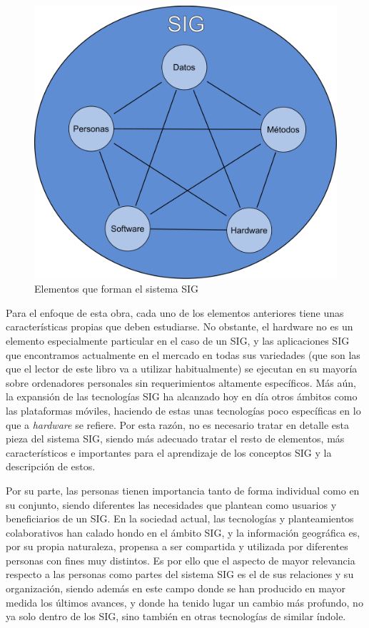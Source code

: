 \begin{figure}[h]   
\centering
\includegraphics[width=.55\mycolumnwidth]{Introduccion_fundamentos/Elementos_SIG.pdf}
\caption{\small Elementos que forman el sistema SIG}
\label{Fig:Elementos_SIG} 
\end{figure}

Para el enfoque de esta obra, cada uno de los elementos anteriores tiene unas características propias que deben estudiarse. No obstante, el hardware no es un elemento especialmente particular en el caso de un SIG, y las aplicaciones SIG que encontramos actualmente en el mercado en todas sus variedades (que son las que el lector de este libro va a utilizar habitualmente) se ejecutan en su mayoría sobre ordenadores personales sin requerimientos altamente específicos. Más aún, la expansión de las tecnologías SIG ha alcanzado hoy en día otros ámbitos como las plataformas móviles, haciendo de estas unas tecnologías poco específicas en lo que a \emph{hardware} se refiere. Por esta razón, no es necesario tratar en detalle esta pieza del sistema SIG, siendo más adecuado tratar el resto de elementos, más característicos e importantes para el aprendizaje de los conceptos SIG y la descripción de estos.

Por su parte, las personas tienen importancia tanto de forma individual como en su conjunto, siendo diferentes las necesidades que plantean como usuarios y beneficiarios de un SIG. En la sociedad actual, las tecnologías y planteamientos colaborativos han calado hondo en el ámbito SIG, y la información geográfica es, por su propia naturaleza, propensa a ser compartida y utilizada por diferentes personas con fines muy distintos. Es por ello que el aspecto de mayor relevancia respecto a las personas como partes del sistema SIG es el de sus relaciones y su organización, siendo además en este campo donde se han producido en mayor medida los últimos avances, y donde ha tenido lugar un cambio más profundo, no ya solo dentro de los SIG, sino también en otras tecnologías de similar índole.

